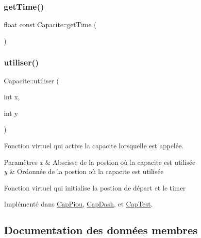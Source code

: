 \subsubsection{\texorpdfstring{get\+Time()}{getTime()}}
{\footnotesize\ttfamily float const Capacite\+::get\+Time (\begin{DoxyParamCaption}{ }\end{DoxyParamCaption})\hspace{0.3cm}{\ttfamily [inline]}}

\mbox{\label{class_capacite_a6f5e6efda11f80ab8538e23f5bdc6e79}} 
\subsubsection{\texorpdfstring{utiliser()}{utiliser()}}
{\footnotesize\ttfamily Capacite\+::utiliser (\begin{DoxyParamCaption}\item[{int}]{x,  }\item[{int}]{y }\end{DoxyParamCaption})\hspace{0.3cm}{\ttfamily [pure virtual]}}



Fonction virtuel qui active la capacite lorsqu\textquotesingle{}elle est appelée. 


\begin{DoxyParams}{Paramètres}
{\em x} & Abscisse de la postion où la capacite est utilisée \\
\hline
{\em y} & Ordonnée de la postion où la capacite est utilisée\\
\hline
\end{DoxyParams}
Fonction virtuel qui initialise la postion de départ et le timer 

Implémenté dans \hyperlink{class_cap_piou_a92f5cc3011280ad13bf3ff5e6a3c76ea}{Cap\+Piou}, \hyperlink{class_cap_dash_a82823122659ff5a87a09e9ddf0e3dabb}{Cap\+Dash}, et \hyperlink{class_cap_test_a9c85a17dec6cf78f1438b08b175f650d}{Cap\+Test}.



\subsection{Documentation des données membres}
\mbox{\label{class_capacite_aa84204be03602333d694faa14dbb693c}} 
